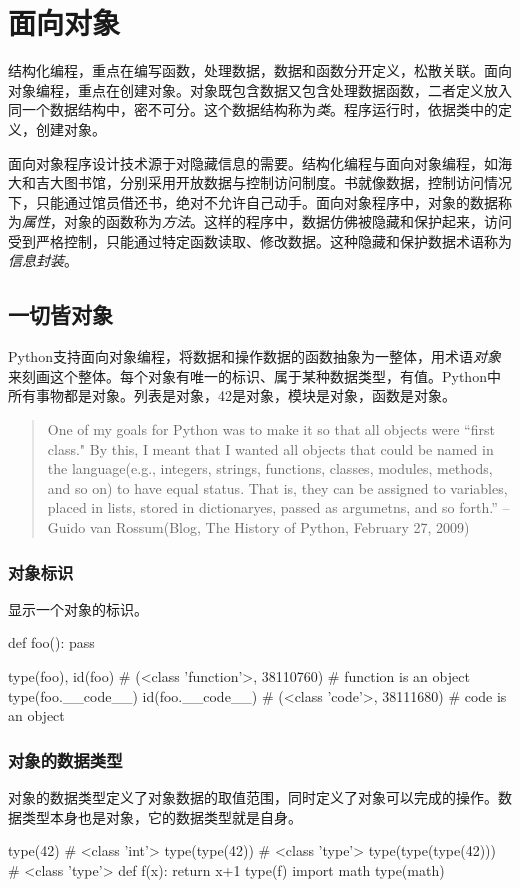 \chapter{面向对象}
结构化编程，重点在编写函数，处理数据，数据和函数分开定义，松散关联。面向对象编程，重点在创建对象。对象既包含数据又包含处理数据函数，二者定义放入同一个数据结构中，密不可分。这个数据结构称为\emph{类}。程序运行时，依据类中的定义，创建对象。

面向对象程序设计技术源于对隐藏信息的需要。结构化编程与面向对象编程，如海大和吉大图书馆，分别采用开放数据与控制访问制度。书就像数据，控制访问情况下，只能通过馆员借还书，绝对不允许自己动手。面向对象程序中，对象的数据称为\emph{属性}，对象的函数称为\emph{方法}。这样的程序中，数据仿佛被隐藏和保护起来，访问受到严格控制，只能通过特定函数读取、修改数据。这种隐藏和保护数据术语称为\emph{信息封装}。

\section{一切皆对象}
Python支持面向对象编程，将数据和操作数据的函数抽象为一整体，用术语\emph{对象}来刻画这个整体。每个对象有唯一的标识、属于某种数据类型，有值。Python中所有事物都是对象。列表是对象，42是对象，模块是对象，函数是对象。
\begin{quotation}
  One of my goals for Python was to make it so that all objects were ``first class."  By this, I meant that I wanted all objects that could be named in the language(e.g., integers, strings, functions, classes, modules, methods, and so on) to have equal status. That is, they can be assigned to variables, placed in lists, stored in dictionaryes, passed as argumetns, and so forth.''
  --Guido van Rossum(Blog, The History of Python, February 27, 2009)
\end{quotation}
\subsection{对象标识}
显示一个对象的标识。
\begin{python}
def foo(): pass

type(foo), id(foo)
# (<class 'function'>, 38110760)   #  function is an object
type(foo.__code__)
id(foo.__code__)
# (<class 'code'>, 38111680)  #  code is an object
\end{python}
\subsection{对象的数据类型}
对象的数据类型定义了对象数据的取值范围，同时定义了对象可以完成的操作。数据类型本身也是对象，它的数据类型就是自身。
\begin{python}
type(42)
#  <class 'int'>
type(type(42))
#  <class 'type'>
type(type(type(42)))
#  <class 'type'>
def f(x):
    return x+1
type(f)
import math
type(math)
\end{python}

